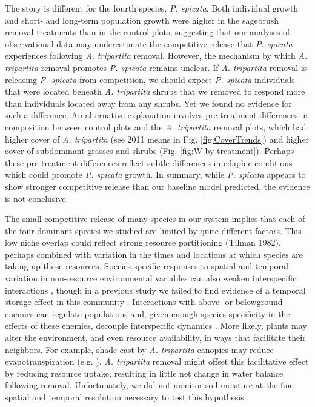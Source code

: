 \documentclass[11pt]{article}
\begin{document}
\begin{doublespacing}
The story is different for the fourth species, \textit{P. spicata}. Both individual growth and short- and long-term population growth were higher in the sagebrush removal treatments than in the control plots, suggesting that our analyses of observational data may underestimate the competitive release that \textit{P. spicata} experiences following \textit{A. tripartita} removal. However, the mechanism by which \textit{A. tripartita} removal promotes \textit{P. spicata} remains unclear. If  \textit{A. tripartita} removal is releasing \textit{P. spicata} from competition, we should expect \textit{P. spicata} individuals that were located beneath \textit{A. tripartita} shrubs that we removed to respond more than individuals located away from any shrubs. Yet we found no evidence for such a difference. An alternative explanation involves pre-treatment differences in composition between control plots and  the \textit{A. tripartita} removal  plots, which had higher cover of \textit{A. tripartita} (see 2011 means in Fig. \ref{fig:CoverTrends}) and higher cover of subdominant grasses and shrubs (Fig. \ref{fig:W-by-treatment}). Perhaps these pre-treatment differences reflect subtle differences in edaphic conditions which could promote \textit{P. spicata} growth. In summary, while \textit{P. spicata} appears to show stronger competitive release than our baseline model predicted, the evidence is not conclusive. 

The small competitive release of many species in our system implies that each of the four dominant species we studied are limited by quite different factors. This low niche overlap could reflect strong resource partitioning (Tilman 1982), perhaps combined with variation in the times and locations at which species are taking up those resources. Species-specific responses to spatial and temporal variation in non-resource environmental variables can also weaken interspecific interactions \citep{chesson_mechanisms_2000}, though in a previous study we failed to find evidence of a temporal storage effect in this community \citep{adler_weak_2009}. Interactions with above- or belowground enemies can regulate populations and, given enough species-specificity in the effects of these enemies, decouple interspecific dynamics \citep{hersh_evaluating_2011,janzen_herbivores_1970,connell_role_1971}.  More likely, plants may alter the environment, and even resource availability, in ways that facilitate their neighbors. For example, shade cast by \textit{A. tripartita} canopies may reduce evapotranspiration (e.g. \citealt{Barbier2008}). \textit{A. tripartita} removal might offset this facilitative effect by reducing resource uptake, resulting in little net change in water balance following removal.  Unfortunately, we did not monitor soil moisture at the fine spatial and temporal resolution necessary to test this hypothesis.


\end{doublespacing}
\end{document}
